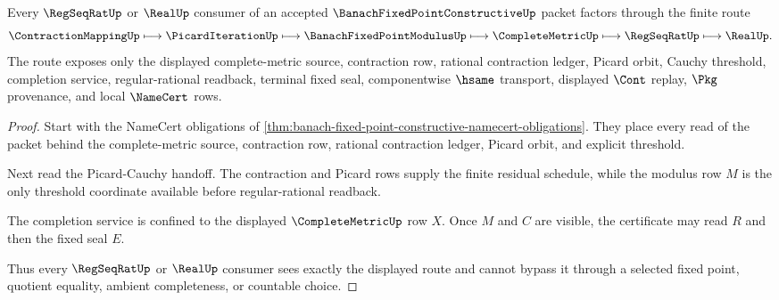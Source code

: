 \begin{theorem}
\label{thm:banach-fixed-point-constructive-picard-cauchy-route}
Every $\RegSeqRatUp$ or $\RealUp$ consumer of an accepted $\BanachFixedPointConstructiveUp$ packet factors through the finite route
$$
\ContractionMappingUp \longmapsto \PicardIterationUp \longmapsto \BanachFixedPointModulusUp \longmapsto \CompleteMetricUp \longmapsto \RegSeqRatUp \longmapsto \RealUp .
$$
The route exposes only the displayed complete-metric source, contraction row, rational contraction ledger, Picard orbit, Cauchy threshold, completion service, regular-rational readback, terminal fixed seal, componentwise $\hsame$ transport, displayed $\Cont$ replay, $\Pkg$ provenance, and local $\NameCert$ rows.
\end{theorem}
\begin{proof}
Start with the NameCert obligations of \autoref{thm:banach-fixed-point-constructive-namecert-obligations}. They place every read of the packet behind the complete-metric source, contraction row, rational contraction ledger, Picard orbit, and explicit threshold.

Next read the Picard-Cauchy handoff. The contraction and Picard rows supply the finite residual schedule, while the modulus row $M$ is the only threshold coordinate available before regular-rational readback.

The completion service is confined to the displayed $\CompleteMetricUp$ row $X$. Once $M$ and $C$ are visible, the certificate may read $R$ and then the fixed seal $E$.

Thus every $\RegSeqRatUp$ or $\RealUp$ consumer sees exactly the displayed route and cannot bypass it through a selected fixed point, quotient equality, ambient completeness, or countable choice.
\end{proof}

